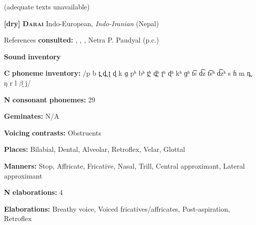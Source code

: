 \documentclass[output=paper]{langsci/langscibook}
\begin{document}
\begin{styleBody}
(adequate texts unavailable)
\end{styleBody}

\begin{styleBody}
\textbf{[dry]}   \textbf{\textsc{Darai}}    Indo-European, \textit{Indo-Iranian} (Nepal)
\end{styleBody}

\begin{styleBody}
References \textbf{consulted:} \citet{Dhakal2012}, \citet{KotapishKotapish1978}, \citet{Paudyal2003}, Netra P. Paudyal (p.c.)
\end{styleBody}

\begin{styleBody}
\textbf{Sound} \textbf{inventory}
\end{styleBody}

\begin{styleBody}
\textbf{C} \textbf{phoneme} \textbf{inventory:} /p b t̪ d̪ ʈ ɖ k ɡ pʰ bʰ t̪ʰ d̪ʰ ʈʰ ɖʰ kʰ ɡʰ t͡s d͡z t͡sʰ d͡zʰ s ɦ m n̪ ŋ r l $\beta ̞$ j/
\end{styleBody}

\begin{styleBody}
\textbf{N} \textbf{consonant} \textbf{phonemes:} 29
\end{styleBody}

\begin{styleBody}
\textbf{Geminates:} N/A
\end{styleBody}

\begin{styleBody}
\textbf{Voicing} \textbf{contrasts:} Obstruents
\end{styleBody}

\begin{styleBody}
\textbf{Places:} Bilabial, Dental, Alveolar, Retroflex, Velar, Glottal
\end{styleBody}

\begin{styleBody}
\textbf{Manners:} Stop, Affricate, Fricative, Nasal, Trill, Central approximant, Lateral approximant
\end{styleBody}

\begin{styleBody}
\textbf{N} \textbf{elaborations:} 4
\end{styleBody}

\begin{styleBody}
\textbf{Elaborations:} Breathy voice, Voiced fricatives/affricates, Post-aspiration, Retroflex
\end{styleBody}
\end{document}
